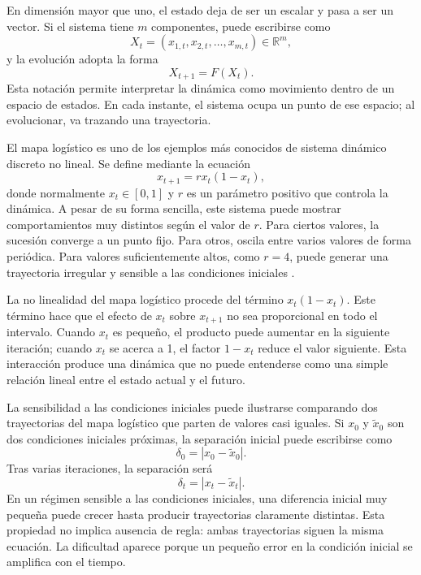 En dimensión mayor que uno, el estado deja de ser un escalar y pasa a ser un vector. Si el sistema tiene \(m\) componentes, puede escribirse como
\begin{equation}
    X_t = (x_{1,t}, x_{2,t}, \ldots, x_{m,t}) \in \mathbb{R}^m,
\end{equation}
y la evolución adopta la forma
\begin{equation}
    X_{t+1} = F(X_t).
\end{equation}
Esta notación permite interpretar la dinámica como movimiento dentro de un espacio de estados. En cada instante, el sistema ocupa un punto de ese espacio; al evolucionar, va trazando una trayectoria.

El mapa logístico es uno de los ejemplos más conocidos de sistema dinámico discreto no lineal. Se define mediante la ecuación
\begin{equation}
    x_{t+1} = r x_t(1-x_t),
\end{equation}
donde normalmente \(x_t \in [0,1]\) y \(r\) es un parámetro positivo que controla la dinámica. A pesar de su forma sencilla, este sistema puede mostrar comportamientos muy distintos según el valor de \(r\). Para ciertos valores, la sucesión converge a un punto fijo. Para otros, oscila entre varios valores de forma periódica. Para valores suficientemente altos, como \(r=4\), puede generar una trayectoria irregular y sensible a las condiciones iniciales \cite{may1976}.

La no linealidad del mapa logístico procede del término \(x_t(1-x_t)\). Este término hace que el efecto de \(x_t\) sobre \(x_{t+1}\) no sea proporcional en todo el intervalo. Cuando \(x_t\) es pequeño, el producto puede aumentar en la siguiente iteración; cuando \(x_t\) se acerca a 1, el factor \(1-x_t\) reduce el valor siguiente. Esta interacción produce una dinámica que no puede entenderse como una simple relación lineal entre el estado actual y el futuro.

La sensibilidad a las condiciones iniciales puede ilustrarse comparando dos trayectorias del mapa logístico que parten de valores casi iguales. Si \(x_0\) y \(\tilde{x}_0\) son dos condiciones iniciales próximas, la separación inicial puede escribirse como
\begin{equation}
    \delta_0 = |x_0-\tilde{x}_0|.
\end{equation}
Tras varias iteraciones, la separación será
\begin{equation}
    \delta_t = |x_t-\tilde{x}_t|.
\end{equation}
En un régimen sensible a las condiciones iniciales, una diferencia inicial muy pequeña puede crecer hasta producir trayectorias claramente distintas. Esta propiedad no implica ausencia de regla: ambas trayectorias siguen la misma ecuación. La dificultad aparece porque un pequeño error en la condición inicial se amplifica con el tiempo.

